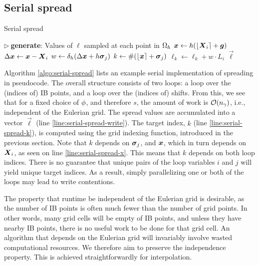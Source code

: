 \subsection{Serial spread}

\begin{algorithm}
\caption{Serial spread}
\label{algo:serial-spread}
\begin{algorithmic}[1]
\State $\triangleright\ $\textbf{generate}: Values of $\ell$ sampled at each point in $\Omega_h$
    \State $\boldsymbol{x} \gets h(\left\lfloor{\boldsymbol{X}_i}\right\rceil+\boldsymbol{g})$\label{line:serial-spread-x}
    \State $\Delta\boldsymbol{x} \gets \boldsymbol{x}-\boldsymbol{X}_i$
        \State $w \gets \delta_h(\Delta\boldsymbol{x}+h\boldsymbol{\sigma}_j)$
        \State $k \gets \#(\left\lfloor{\boldsymbol{x}}\right\rceil + \boldsymbol{\sigma}_j)$ \label{line:serial-spread-k}
            \State $\ell_k \gets \ell_k + w \cdot L_i$ \label{line:serial-spread-write}
        \EndIf
    \EndFor
\EndFor
\State \Return $\vec{\ell}$
\EndProcedure
\end{algorithmic}
\end{algorithm}

Algorithm \ref{algo:serial-spread} lists an example serial implementation of spreading in
pseudocode. The overall structure consists of two loops: a loop over the (indices of)
IB points, and a loop over the (indices of) shifts. From this, we see that for a fixed
choice of $\phi$, and therefore $s$, the amount of work is $\mathcal{O}({n_\gamma})$, i.e.,
independent of the Eulerian grid. The spread values are accumulated into a vector
$\vec{\ell}$ (line \ref{line:serial-spread-write}). The target index, $k$ (line
\ref{line:serial-spread-k}), is computed using the grid indexing function, introduced in
the previous section. Note that $k$ depends on $\boldsymbol{\sigma}_j$, and $\boldsymbol{x}$, which in turn
depends on $\boldsymbol{X}_i$, as seen on line \ref{line:serial-spread-x}. This means that $k$
depends on both loop indices. There is no guarantee that unique pairs of the loop
variables $i$ and $j$ will yield unique target indices. As a result, simply parallelizing
one or both of the loops may lead to write contentions.

The property that runtime be independent of the Eulerian grid is desirable, as the
number of IB points is often much fewer than the number of grid points. In other words,
many grid cells will be empty of IB points, and unless they have nearby IB points, there
is no useful work to be done for that grid cell. An algorithm that depends on the
Eulerian grid will invariably involve wasted computational resources. We therefore aim to
preserve the independence property. This is achieved straightforwardly for interpolation.

